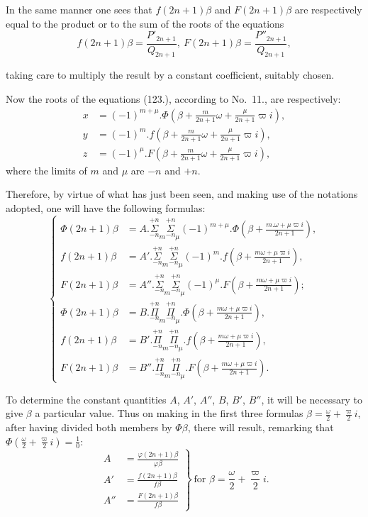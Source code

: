 \documentclass{article}
\begin{document}
In the same manner one sees that $f(2n+1)\beta$ and $F(2n+1)\beta$ are respectively equal to the product or to the sum of the roots of the equations
\[ f(2n+1)\beta=\frac{P'_{2n+1}}{Q_{2n+1}},\ F(2n+1)\beta=\frac{P''_{2n+1}}{Q_{2n+1}}, \]

taking care to multiply the result by a constant coefficient, suitably chosen.

Now the roots of the equations (123.), according to No.\ 11., are respectively:
\[ \begin{aligned}
x&=(-1)^{m+\mu}.\Phi\left(\beta+\frac{m}{2n+1}\omega+\frac{\mu}{2n+1}\varpi i\right),\\
y&=(-1)^{m}.f\left(\beta+\frac{m}{2n+1}\omega+\frac{\mu}{2n+1}\varpi i\right),\\
z&=(-1)^{\mu}.F\left(\beta+\frac{m}{2n+1}\omega+\frac{\mu}{2n+1}\varpi i\right),
\end{aligned} \]
where the limits of $m$ and $\mu$ are $-n$ and $+n$.

Therefore, by virtue of what has just been seen, and making use of the notations adopted, one will have the following formulas:
\[ \left\{\begin{aligned}
\Phi(2n+1)\beta&=A.\overset{+n}{\underset{-n}{\Sigma}}_{m}\overset{+n}{\underset{-n}{\Sigma}}_{\mu}(-1)^{m+\mu}.\Phi\left(\beta+\frac{m.\omega+\mu\varpi i}{2n+1}\right),\\
f(2n+1)\beta&=A'.\overset{+n}{\underset{-n}{\Sigma}}_{m}\overset{+n}{\underset{-n}{\Sigma}}_{\mu}(-1)^{m}.f\left(\beta+\frac{m\omega+\mu\varpi i}{2n+1}\right),\\
F(2n+1)\beta&=A''.\overset{+n}{\underset{-n}{\Sigma}}_{m}\overset{+n}{\underset{-n}{\Sigma}}_{\mu}(-1)^{\mu}.F\left(\beta+\frac{m\omega+\mu\varpi i}{2n+1}\right);\\
\Phi(2n+1)\beta&=B.\overset{+n}{\underset{-n}{\Pi}}_{m}\overset{+n}{\underset{-n}{\Pi}}_{\mu}.\Phi\left(\beta+\frac{m\omega+\mu\varpi i}{2n+1}\right),\\
f(2n+1)\beta&=B'.\overset{+n}{\underset{-n}{\Pi}}_{m}\overset{+n}{\underset{-n}{\Pi}}_{\mu}.f\left(\beta+\frac{m\omega+\mu\varpi i}{2n+1}\right),\\
F(2n+1)\beta&=B''.\overset{+n}{\underset{-n}{\Pi}}_{m}\overset{+n}{\underset{-n}{\Pi}}_{\mu}.F\left(\beta+\frac{m\omega+\mu\varpi i}{2n+1}\right).
\end{aligned}\right. \tag{125.} \]

To determine the constant quantities $A$, $A'$, $A''$, $B$, $B'$, $B''$, it will be necessary to give $\beta$ a particular value. Thus on making in the first three formulas $\beta=\frac{\omega}{2}+\frac{\varpi}{2}i$, after having divided both members by $\Phi\beta$, there will result, remarking that $\Phi\left(\frac{\omega}{2}+\frac{\varpi}{2}i\right)=\frac{1}{0}$:
\[ \left.\begin{aligned}
A&=\frac{\varphi(2n+1)\beta}{\varphi\beta}\\
A'&=\frac{f(2n+1)\beta}{f\beta}\\
A''&=\frac{F(2n+1)\beta}{f\beta}
\end{aligned}\right\}\ \text{for }\beta=\frac{\omega}{2}+\frac{\varpi}{2}i. \]
\end{document}
